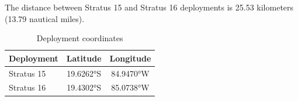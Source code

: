 
The distance between Stratus 15 and Stratus 16 deployments is 25.53 kilometers (13.79 nautical miles).

\begin{table}[ht]
\centering
\caption{Deployment coordinates}
\begin{tabular}{lcc}
\hline
\textbf{Deployment} & \textbf{Latitude} & \textbf{Longitude} \\
\hline
Stratus 15 & 19.6262°S & 84.9470°W \\
Stratus 16 & 19.4302°S & 85.0738°W \\
\hline
\end{tabular}
\end{table}
